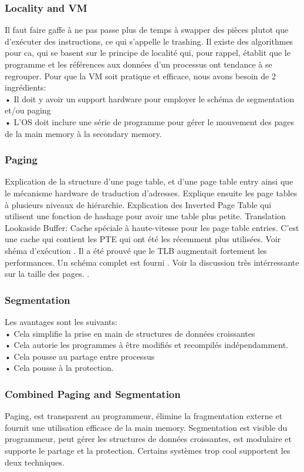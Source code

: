\subsubsection{Locality and VM}
Il faut faire gaffe à ne pas passe plus de temps à swapper des pièces plutot que d'exécuter des instructions, ce qui s'appelle le trashing.
Il existe des algorithmes pour ca, qui se basent sur le principe de localité qui, pour rappel, établit que le programme et les références aux données d'un processus ont tendance à se regrouper.
Pour que la VM soit pratique et efficace, nous avons besoin de 2 ingrédients:\\
• Il doit y avoir un support hardware pour employer le schéma de segmentation et/ou paging\\
• L'OS doit inclure une série de programme pour gérer le mouvement des pages de la main memory à la secondary memory.\\
\subsubsection{Paging}
Explication de la structure d'une page table, et d'une page table entry ainsi que le mécanisme hardware de traduction d'adresses.
Explique ensuite les page tables à plusieurs niveaux de hiérarchie.
Explication des Inverted Page Table qui utilisent une fonction de hashage pour avoir une table plus petite.
Translation Lookaside Buffer: Cache spéciale à haute-vitesse pour les page table entries.
C'est une cache qui contient les PTE qui ont été les récemment plus utilisées.
Voir shéma d'exécution \cite[p.~351]{stallings}.
Il a été prouvé que le TLB augmentait fortement les performances.
Un schéma complet est fourni \cite[p.~352-353]{stallings}.
Voir la discussion très intérressante sur la taille des pages.
\cite[p.~354-355]{stallings}.
\subsubsection{Segmentation}
Les avantages sont les suivants:\\
• Cela simplifie la prise en main de structures de données croissantes\\
• Cela autorie les programmes à être modifiés et recompilés indépendamment.\\
• Cela pousse au partage entre processus\\
• Cela pousse à la protection.
\subsubsection{Combined Paging and Segmentation}
Paging, est transparent au programmeur, élimine la fragmentation externe et fournit une utilisation efficace de la main memory.
Segmentation est visible du programmeur, peut gérer les structures de données croissantes, est modulaire et supporte le partage et la protection.
Certains systèmes trop cool supportent les deux techniques.
